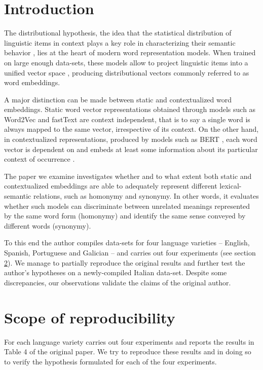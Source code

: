 \section{Introduction}
The distributional hypothesis, the idea that the statistical distribution of linguistic items in context plays a key role in characterizing their semantic behavior \citep{harris:distributional, lenci:ds:models}, lies at the heart of modern word representation models. When trained on large enough data-sets, these models allow to project linguistic items into a unified vector space \citep{Liu2020}, producing distributional vectors commonly referred to as word embeddings.

A major distinction can be made between static and contextualized word embeddings. Static word vector representations obtained through models such as Word2Vec \citep{word2vec:mikolov2013} and fastText \citep{fasttext:bojanowski:2017} are context independent, that is to say a single word is always mapped to the same vector, irrespective of its context. On the other hand, in contextualized representations, produced by models such as BERT \citep{BERT:devlin2019}, each word vector is dependent on and embeds at least some information about its particular context of occurrence \citep{BERTology:rogers}.

The paper we examine \citep{garcia:acl} investigates whether and to what extent both static and contextualized embeddings are able to adequately represent different lexical-semantic relations, such as homonymy and synonymy. In other words, it evaluates whether such models can discriminate between unrelated meanings represented by the same word form (homonymy) and identify the same sense conveyed by different words (synonymy).

To this end the author compiles data-sets for four language varieties -- English, Spanish, Portuguese and Galician -- and carries out four experiments (see section \ref{sec:claims}). We manage to partially reproduce the original results and further test the author's hypotheses on a newly-compiled Italian data-set. Despite some discrepancies, our observations validate the claims of the original author.


\section{Scope of reproducibility}
\label{sec:claims}

For each language variety \citet{garcia:acl} carries out four experiments and reports the results in Table 4 of the original paper. We try to reproduce these results and in doing so to verify the hypothesis formulated for each of the four experiments.

